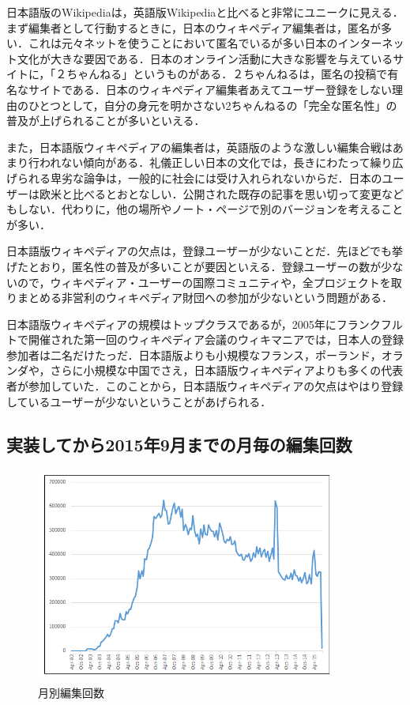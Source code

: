 日本語版のWikipediaは，英語版Wikipediaと比べると非常にユニークに見える．まず編集者として行動するときに，日本のウィキペディア編集者は，匿名が多い．これは元々ネットを使うことにおいて匿名でいるが多い日本のインターネット文化が大きな要因である．日本のオンライン活動に大きな影響を与えているサイトに，「２ちゃんねる」というものがある．２ちゃんねるは，匿名の投稿で有名なサイトである．日本のウィキペディア編集者あえてユーザー登録をしない理由のひとつとして，自分の身元を明かさない2ちゃんねるの「完全な匿名性」の普及が上げられることが多いといえる．

また，日本語版ウィキペディアの編集者は，英語版のような激しい編集合戦はあまり行われない傾向がある．礼儀正しい日本の文化では，長きにわたって繰り広げられる卑劣な論争は，一般的に社会には受け入れられないからだ．日本のユーザーは欧米と比べるとおとなしい．公開された既存の記事を思い切って変更などもしない．代わりに，他の場所やノート・ページで別のバージョンを考えることが多い．

日本語版ウィキペディアの欠点は，登録ユーザーが少ないことだ．先ほどでも挙げたとおり，匿名性の普及が多いことが要因といえる．登録ユーザーの数が少ないので，ウィキペディア・ユーザーの国際コミュニティや，全プロジェクトを取りまとめる非営利のウィキペディア財団への参加が少ないという問題がある．

日本語版ウィキペディアの規模はトップクラスであるが，2005年にフランクフルトで開催された第一回のウィキペディア会議のウィキマニアでは，日本人の登録参加者は二名だけたっだ．日本語版よりも小規模なフランス，ポーランド，オランダや，さらに小規模な中国でさえ，日本語版ウィキペディアよりも多くの代表者が参加していた．このことから，日本語版ウィキペディアの欠点はやはり登録しているユーザーが少ないということがあげられる．



\clearpage


\subsection{実装してから2015年9月までの月毎の編集回数}

\begin{figure}[H]
\centering
\includegraphics[width=10cm]{month1.png}
\caption{月別編集回数}\label{サンプル図}
\end{figure}

